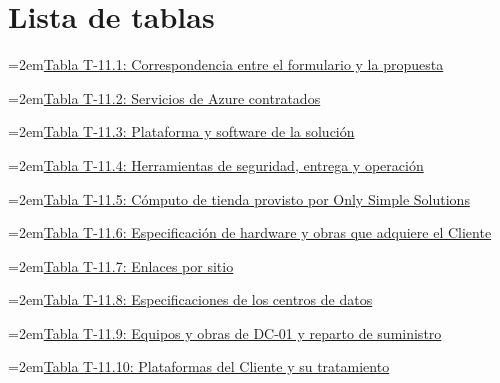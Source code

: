 \documentclass[11pt]{article}
\begin{document}
\tableofcontents
\clearpage
\section*{Lista de tablas}

\noindent\hangindent=2em\hyperref[tab:t11-1]{Tabla T-11.1: Correspondencia entre el formulario y la propuesta}\dotfill\pageref{tab:t11-1}\par\vspace{0.4\baselineskip}
\noindent\hangindent=2em\hyperref[tab:t11-2]{Tabla T-11.2: Servicios de Azure contratados}\dotfill\pageref{tab:t11-2}\par\vspace{0.4\baselineskip}
\noindent\hangindent=2em\hyperref[tab:t11-3]{Tabla T-11.3: Plataforma y software de la solución}\dotfill\pageref{tab:t11-3}\par\vspace{0.4\baselineskip}
\noindent\hangindent=2em\hyperref[tab:t11-4]{Tabla T-11.4: Herramientas de seguridad, entrega y operación}\dotfill\pageref{tab:t11-4}\par\vspace{0.4\baselineskip}
\noindent\hangindent=2em\hyperref[tab:t11-5]{Tabla T-11.5: Cómputo de tienda provisto por Only Simple Solutions}\dotfill\pageref{tab:t11-5}\par\vspace{0.4\baselineskip}
\noindent\hangindent=2em\hyperref[tab:t11-6]{Tabla T-11.6: Especificación de hardware y obras que adquiere el Cliente}\dotfill\pageref{tab:t11-6}\par\vspace{0.4\baselineskip}
\noindent\hangindent=2em\hyperref[tab:t11-7]{Tabla T-11.7: Enlaces por sitio}\dotfill\pageref{tab:t11-7}\par\vspace{0.4\baselineskip}
\noindent\hangindent=2em\hyperref[tab:t11-8]{Tabla T-11.8: Especificaciones de los centros de datos}\dotfill\pageref{tab:t11-8}\par\vspace{0.4\baselineskip}
\noindent\hangindent=2em\hyperref[tab:t11-dc01]{Tabla T-11.9: Equipos y obras de DC-01 y reparto de suministro}\dotfill\pageref{tab:t11-dc01}\par\vspace{0.4\baselineskip}
\noindent\hangindent=2em\hyperref[tab:t11-9]{Tabla T-11.10: Plataformas del Cliente y su tratamiento}\dotfill\pageref{tab:t11-9}\par\vspace{0.4\baselineskip}
\end{document}
